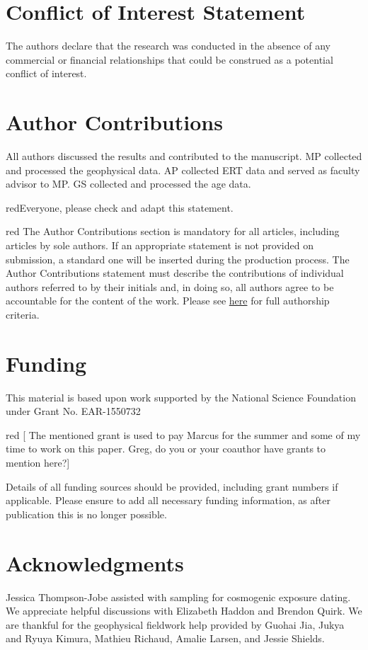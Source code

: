 \documentclass[utf8]{frontiersSCNS}
\newcommand{\alon}{\begin{color}{red}}
\newcommand{\aloff}{\end{color}}
\begin{document}
\section*{Conflict of Interest Statement}
The authors declare that the research was conducted in the absence of any commercial or financial relationships that could be construed as a potential conflict of interest.


\section*{Author Contributions}
All authors discussed the results and contributed to the manuscript. MP collected and processed the geophysical data. AP collected ERT data and served as faculty advisor to MP. GS collected and processed the  age data. 

\alon Everyone, please check and adapt this statement. \aloff

\alon
The Author Contributions section is mandatory for all articles, including articles by sole authors. If an appropriate statement is not provided on submission, a standard one will be inserted during the production process. The Author Contributions statement must describe the contributions of individual authors referred to by their initials and, in doing so, all authors agree to be accountable for the content of the work. Please see  \href{http://home.frontiersin.org/about/author-guidelines#AuthorandContributors}{here} for full authorship criteria.
\aloff

\section*{Funding}
This material is based upon work supported by the National Science Foundation under Grant No. EAR-1550732

\alon 
[ The mentioned grant is used to pay Marcus for the summer and some of my time to work on this paper. Greg, do you or your coauthor have grants to mention here?]

Details of all funding sources should be provided, including grant numbers if applicable. Please ensure to add all necessary funding information, as after publication this is no longer possible.
\aloff

\section*{Acknowledgments}

Jessica Thompson-Jobe assisted with sampling for cosmogenic exposure dating.  We appreciate helpful discussions with Elizabeth Haddon and Brendon Quirk. We are thankful for the geophysical fieldwork help provided by Guohai Jia, Jukya and Ryuya Kimura, Mathieu Richaud, Amalie Larsen, and Jessie Shields. 
\end{document}
